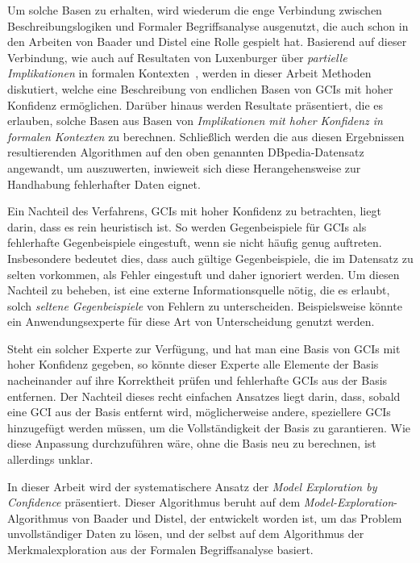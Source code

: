\documentclass[ngerman,fleqn,DIV=12]{scrartcl}
\begin{document}
Um solche Basen zu erhalten, wird wiederum die enge Verbindung zwischen
Beschreibungslogiken und Formaler Begriffsanalyse ausgenutzt, die auch schon in den
Arbeiten von Baader und Distel eine Rolle gespielt hat.  Basierend auf dieser Verbindung,
wie auch auf Resultaten von Luxenburger über \emph{partielle Implikationen} in formalen
Kontexten~\cite{diss:Luxenburger}, werden in dieser Arbeit Methoden diskutiert, welche
eine Beschreibung von endlichen Basen von GCIs mit hoher Konfidenz ermöglichen.  Darüber
hinaus werden Resultate präsentiert, die es erlauben, solche Basen aus Basen von
\emph{Implikationen mit hoher Konfidenz in formalen Kontexten} zu berechnen.  Schließlich
werden die aus diesen Ergebnissen resultierenden Algorithmen auf den oben genannten
DBpedia-Datensatz angewandt, um auszuwerten, inwieweit sich diese Herangehensweise zur
Handhabung fehlerhafter Daten eignet.

Ein Nachteil des Verfahrens, GCIs mit hoher Konfidenz zu betrachten, liegt darin, dass es
rein heuristisch ist.  So werden Gegenbeispiele für GCIs als fehlerhafte Gegenbeispiele
eingestuft, wenn sie nicht häufig genug auftreten.  Insbesondere bedeutet dies, dass auch
gültige Gegenbeispiele, die im Datensatz zu selten vorkommen, als Fehler eingestuft und
daher ignoriert werden.  Um diesen Nachteil zu beheben, ist eine externe
Informationsquelle nötig, die es erlaubt, solch \emph{seltene Gegenbeispiele} von Fehlern
zu unterscheiden.  Beispielsweise könnte ein Anwendungsexperte für diese Art von
Unterscheidung genutzt werden.

Steht ein solcher Experte zur Verfügung, und hat man eine Basis von GCIs mit hoher
Konfidenz gegeben, so könnte dieser Experte alle Elemente der Basis nacheinander auf ihre
Korrektheit prüfen und fehlerhafte GCIs aus der Basis entfernen.  Der Nachteil dieses
recht einfachen Ansatzes liegt darin, dass, sobald eine GCI aus der Basis entfernt wird,
möglicherweise andere, speziellere GCIs hinzugefügt werden müssen, um die Vollständigkeit
der Basis zu garantieren.  Wie diese Anpassung durchzuführen wäre, ohne die Basis neu zu
berechnen, ist allerdings unklar.

In dieser Arbeit wird der systematischere Ansatz der \emph{Model Exploration by
  Confidence} präsentiert.  Dieser Algorithmus beruht auf dem
\emph{Model-Exploration}-Algorithmus von Baader und Distel, der entwickelt worden ist, um
das Problem unvollständiger Daten zu lösen, und der selbst auf dem Algorithmus der
Merkmalexploration aus der Formalen Begriffsanalyse basiert.
\end{document}
